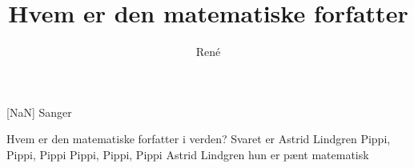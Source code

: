 \documentclass[a4paper,11pt]{article}
\title{Hvem er den matematiske forfatter}
\author{René}
\begin{document}
\maketitle

\begin{roles}
[NaN] Sanger
\end{roles}

\begin{song}
 Hvem er den matematiske forfatter i verden?
Svaret er Astrid Lindgren
Pippi, Pippi, Pippi
Pippi, Pippi, Pippi
Astrid Lindgren hun er pænt matematisk
\end{song}
\end{document}
